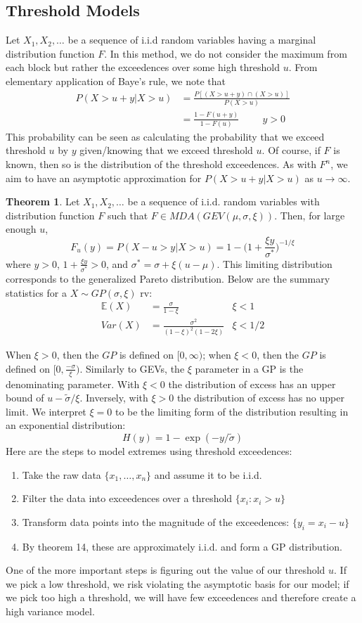 \documentclass{article}
\theoremstyle{definition}
\newtheorem{theorem}{Theorem}
\theoremstyle{definition}
\def\E{\mathbb{E}}
\def\xs{\{x_1, \hdots, x_n\}}
\begin{document}
\subsection{Threshold Models}
Let $X_1, X_2, \hdots$ be a sequence of i.i.d random variables having a marginal distribution function $F$. In this method, we do not consider the maximum from each block but rather the exceedences over some high threshold $u$. From elementary application of Baye's rule, we note that 
\begin{align*}
    P(X>u+y|X>u)&=\frac{P[(X>u+y)\cap (X>u)]}{P(X>u)}\\
    &=\frac{1-F(u+y)}{1-F(u)} \hspace{1cm} y>0
\end{align*}
This probability can be seen as calculating the probability that we exceed threshold $u$ by $y$ given/knowing that we exceed threshold $u$. Of course, if $F$ is known, then so is the distribution of the threshold exceedences. As with $F^n$, we aim to have an asymptotic approximation for $P(X>u+y|X>u)$ as $u \rightarrow \infty$.
\begin{theorem}
Let $X_1,X_2,\hdots$ be a sequence of i.i.d. random variables with distribution function $F$ such that $F\in MDA(GEV(\mu,\sigma, \xi))$. Then, for large enough $u$,
\[F_u(y)= P(X-u>y|X>u)= 1-\bigg(1+\frac{\xi y}{\sigma^*} \bigg)^{-1/\xi}\]
where $y>0$, $1+\frac{\xi y}{\sigma^*} >0$, and $\sigma^*= \sigma+ \xi(u-\mu)$.
This limiting distribution corresponds to the generalized Pareto distribution. Below are the summary statistics for a $X\sim GP(\sigma, \xi)$ rv:
\begin{align*}
    \E(X)&=\frac{\sigma}{1-\xi} &\xi<1\\
    Var(X)&= \frac{\sigma^2}{(1-\xi)^2(1-2\xi)}&\xi<1/2
\end{align*}
\end{theorem}
When $\xi>0$, then the $GP$ is defined on $[0,\infty)$; when $\xi<0$, then the $GP$ is defined on $[0,\frac{-\sigma}{\xi})$. Similarly to GEVs, the $\xi$ parameter in a GP is the denominating parameter. With $\xi<0$ the distribution of excess has an upper bound of $u- \tilde{\sigma}/\xi$. Inversely, with $\xi>0$ the distribution of excess has no upper limit. We interpret $\xi=0$ to be the limiting form of the distribution resulting in an exponential distribution:
\[H(y)= 1-\exp(-y/\tilde{\sigma})\]
Here are the steps to model extremes using threshold exceedences:
\begin{enumerate}
    \item Take the raw data $\xs$ and assume it to be i.i.d.
    \item Filter the data into exceedences over a threshold $\{x_i: x_i>u\}$
    \item Transform data points into the magnitude of the exceedences: $\{y_i =x_i-u\}$
    \item By theorem 14, these are approximately i.i.d. and form a GP distribution.
\end{enumerate}
One of the more important steps is figuring out the value of our threshold $u$. If we pick a low threshold, we risk violating the asymptotic basis for our model; if we pick too high a threshold, we will have few exceedences and therefore create a high variance model.
\end{document}
